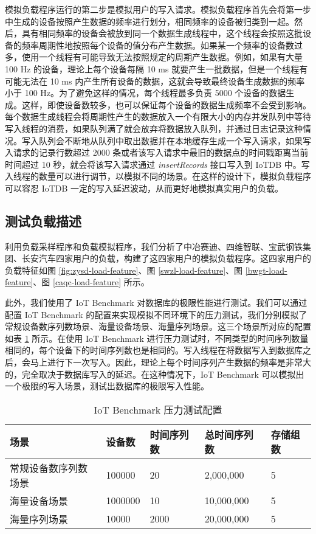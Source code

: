 模拟负载程序运行的第二步是模拟用户的写入请求。模拟负载程序首先会将第一步中生成的设备按照产生数据的频率进行划分，相同频率的设备被归类到一起。然后，具有相同频率的设备会被放到同一个数据生成线程中，这个线程会按照这批设备的频率周期性地按照每个设备的值分布产生数据。如果某一个频率的设备数过多，使用一个线程有可能导致无法按照规定的周期产生数据。例如，如果有大量 100 Hz 的设备，理论上每个设备每隔 10 ms 就要产生一批数据，但是一个线程有可能无法在 10 ms 内产生所有设备的数据，这就会导致最终设备生成数据的频率小于 100 Hz。为了避免这样的情况，每个线程最多负责 5000 个设备的数据生成。这样，即使设备数较多，也可以保证每个设备的数据生成频率不会受到影响。每个数据生成线程会将周期性产生的数据放入一个有限大小的内存并发队列中等待写入线程的消费，如果队列满了就会放弃将数据放入队列，并通过日志记录这种情况。写入队列会不断地从队列中取出数据并在本地缓存生成一个写入请求，如果写入请求的记录行数超过 2000 条或者该写入请求中最旧的数据点的时间戳距离当前时间超过 10 秒，就会将该写入请求通过 \emph{insertRecords} 接口写入到 IoTDB 中。写入线程的数量可以进行调节，以模拟不同的场景。在这样的设计下，模拟负载程序可以容忍 IoTDB 一定的写入延迟波动，从而更好地模拟真实用户的负载。
\subsection{测试负载描述}
利用负载采样程序和负载模拟程序，我们分析了中冶赛迪、四维智联、宝武钢铁集团、长安汽车四家用户的负载，构建了这四家用户的模拟负载程序。这四家用户的负载特征如图 \ref{fig:zysd-load-feature}、图 \ref{swzl-load-feature}、图 \ref{bwgt-load-feature}、图 \ref{caqc-load-feature} 所示。

此外，我们使用了 IoT Benchmark 对数据库的极限性能进行测试。我们可以通过配置 IoT Benchmark 的配置来实现模拟不同环境下的压力测试，我们分别模拟了常规设备数序列数场景、海量设备场景、海量序列场景。这三个场景所对应的配置如表 \ref{tabular:iot-benchmark-config} 所示。在使用 IoT Benchmark 进行压力测试时，不同类型的时间序列数量相同的，每个设备下的时间序列数也是相同的。写入线程在将数据写入到数据库之后，会马上进行下一次写入。因此，理论上每个时间序列产生数据的频率是非常大的，完全取决于数据库写入的延迟。在这种情况下，IoT Benchmark 可以模拟出一个极限的写入场景，测试出数据库的极限写入性能。

\begin{table}
  \centering
  \caption{IoT Benchmark 压力测试配置}
  \begin{tabular}{lllll}
    \toprule 
    场景 & 设备数 & 时间序列数 & 总时间序列数 & 存储组数  \\
    \midrule 
    常规设备数序列数场景 & 100000 & 20 & 2,000,000 & 5  \\
    海量设备场景 & 1000000 & 10 & 10,000,000 & 5  \\
    海量序列场景 & 10000 & 2000 & 20,000,000 & 5  \\
    \bottomrule
  \end{tabular}
  \label{tabular:iot-benchmark-config}
\end{table}


